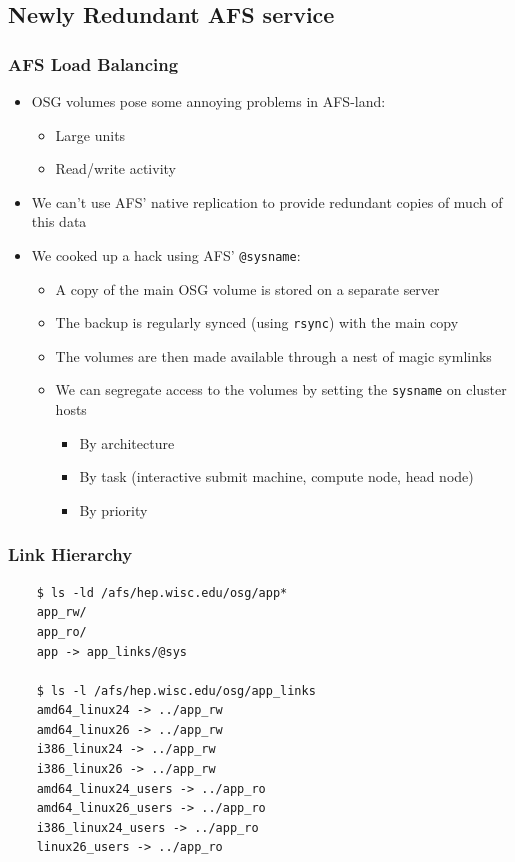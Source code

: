 \documentclass{beamer}
\begin{document}
\subsection{Newly Redundant AFS service}
\begin{frame}
\frametitle{AFS Load Balancing}
\begin{itemize}
    \item OSG volumes pose some annoying problems in AFS-land:
    \begin{itemize}
        \item Large units
        \item Read/write activity
    \end{itemize}
    \item We can't use AFS' native replication to provide redundant copies of  
    much of this data
    \item We cooked up a hack using AFS' {\tt @sysname}:
    \begin{itemize}
        \item A copy of the main OSG volume is stored on a separate server
        \item The backup is regularly synced (using {\tt rsync}) with the main copy
        \item The volumes are then made available through a nest of magic symlinks
        \item We can segregate access to the volumes by setting the {\tt sysname} on cluster hosts
        \begin{itemize}
            \item By architecture
            \item By task (interactive submit machine, compute node, head node)
            \item By priority
        \end{itemize}
    \end{itemize}
\end{itemize}
\end{frame}

\begin{frame}[fragile]
\frametitle{Link Hierarchy}
\begin{verbatim}
    $ ls -ld /afs/hep.wisc.edu/osg/app*
    app_rw/
    app_ro/
    app -> app_links/@sys

    $ ls -l /afs/hep.wisc.edu/osg/app_links
    amd64_linux24 -> ../app_rw
    amd64_linux26 -> ../app_rw
    i386_linux24 -> ../app_rw
    i386_linux26 -> ../app_rw
    amd64_linux24_users -> ../app_ro
    amd64_linux26_users -> ../app_ro
    i386_linux24_users -> ../app_ro
    linux26_users -> ../app_ro
\end{verbatim}
\end{frame}
\end{document}
